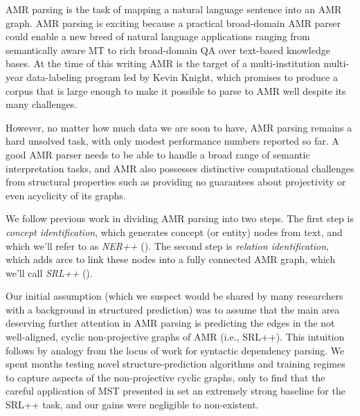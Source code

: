 \documentclass[11pt]{article}
\begin{document}
AMR parsing is the task of mapping a natural language sentence into an AMR graph.
AMR parsing is exciting because a practical broad-domain AMR parser could enable a new breed of natural language applications ranging from semantically aware MT to rich broad-domain QA over text-based knowledge bases.
At the time of this writing AMR is the target of a multi-institution multi-year data-labeling program led by Kevin Knight, which promises to produce a corpus that is large enough to make it possible to parse to AMR well despite its many challenges.


However, no matter how much data we are soon to have, AMR parsing remains a hard unsolved task, with only modest performance numbers reported so far.
A good AMR parser needs to be able to handle a broad range of semantic interpretation tasks, and 
AMR also possesses distinctive computational challenges from structural properties such as providing no guarantees about projectivity or even acyclicity of its graphs.

We follow previous work \cite{2014flanigan-amr} in dividing AMR parsing into two steps. 
The first step is \textit{concept identification}, which generates concept (or entity) nodes from text, and which we'll refer to as \textit{NER++} (). 
The second step is \textit{relation identification}, which adds arcs to link these nodes into a fully connected AMR graph, which we'll call \textit{SRL++} ().

Our initial assumption (which we suspect would be shared by many researchers with a background in structured prediction) was to assume that the main area deserving further attention in AMR parsing is predicting the edges in the not well-aligned, cyclic non-projective graphs of AMR (i.e., SRL++).
This intuition follows by analogy from the locus of work for syntactic dependency parsing. We spent months testing novel structure-prediction algorithms and training regimes to capture aspects of the non-projective cyclic graphs, only to find that the careful application of MST presented in  set an extremely strong baseline for the SRL++ task, and our gains were negligible to non-existent.
\end{document}
